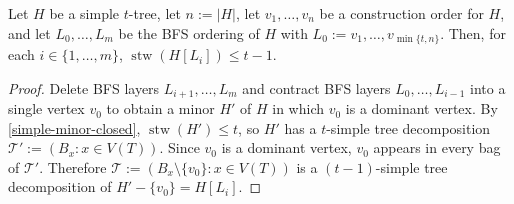 \documentclass[kpfonts]{patmorin}
\DeclareMathOperator{\stw}{stw}
\theoremstyle{named}
\begin{document}
\begin{lem}\label{simple-bfs-layers}
    Let $H$ be a simple $t$-tree, let $n:=|H|$, let $v_1,\ldots,v_n$ be a construction order for $H$, and let $L_0,\ldots,L_m$ be the BFS ordering of $H$ with $L_0:=v_1,\ldots,v_{\min\{t,n\}}$.   Then, for each $i\in\{1,\ldots,m\}$, $\stw(H[L_i])\le t-1$.
\end{lem}

\begin{proof}
    Delete BFS layers $L_{i+1},\ldots,L_m$ and contract BFS layers $L_0,\ldots,L_{i-1}$ into a single vertex $v_0$ to obtain a minor $H'$ of $H$ in which $v_0$ is a dominant vertex.  By \cref{simple-minor-closed}, $\stw(H')\le t$, so $H'$ has a $t$-simple tree decomposition $\mathcal{T}':=(B_x:x\in V(T))$.  Since $v_0$ is a dominant vertex, $v_0$ appears in every bag of $\mathcal{T}'$.  Therefore $\mathcal{T}:=(B_x\setminus\{v_0\}:x\in V(T))$ is a $(t-1)$-simple tree decomposition of $H'-\{v_0\}=H[L_i]$.
\end{proof}




\end{document}
